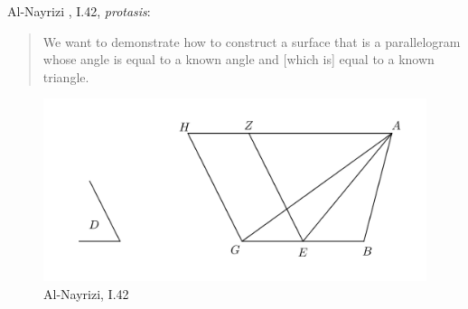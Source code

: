 \documentclass{article}
\begin{document}
Al-Nayrizi \cite[p.~185]{alnayriziI}, I.42, {\em protasis}:

\begin{quote}
We want to demonstrate how to construct a surface that is a 
parallelogram whose angle is equal to a known angle and [which is]
equal to a known triangle.
\end{quote}

\begin{figure}
\begin{center}
\includegraphics{nayriziI42.png}
\end{center}
\caption{Al-Nayrizi, I.42}
\label{nayriziI42}
\end{figure}
\end{document}
